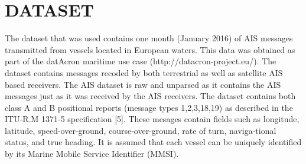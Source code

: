 \documentclass{article}
\begin{document}
% 
% 
% 
% 
 
\section{DATASET}
The dataset that was used contains one month (January 2016) of AIS messages transmitted from vessels located in European waters. This data was
obtained as part of the datAcron maritime use case (http://datacron-project.eu/).  
The dataset contains messages recoded by both terrestrial as well as satellite AIS based receivers. The AIS dataset is raw and unparsed as it contains the AIS messages 
just as it was received by the AIS receivers. The dataset contains both class A and B positional reports (message types 1,2,3,18,19)
as described in the ITU-R.M 1371-5 specification [5]. These mesages contain fields such as longitude, latitude,
speed-over-ground, course-over-ground, rate of turn, naviga-tional status, and true heading. It is assumed that each vessel
can be uniquely identified by its Marine Mobile Service Identifier (MMSI). 
\end{document}
